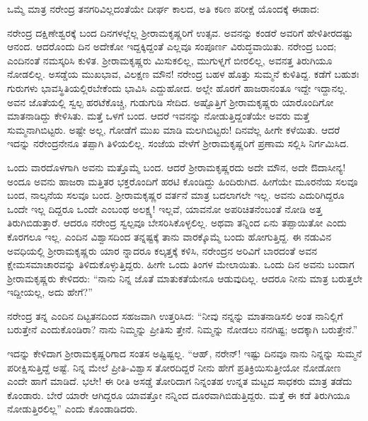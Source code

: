 ಒಮ್ಮೆ ಮಾತ್ರ ನರೇಂದ್ರ ತನಗರಿವಿಲ್ಲದಂತೆಯೇ ದೀರ್ಘ ಕಾಲದ, ಅತಿ ಕಠಿಣ ಪರೀಕ್ಷೆ ಯೊಂದಕ್ಕೆ ಈಡಾದ:

ನರೇಂದ್ರ ದಕ್ಷಿಣೇಶ್ವರಕ್ಕೆ ಬಂದ ದಿನಗಳಲ್ಲೆಲ್ಲ ಶ್ರೀರಾಮಕೃಷ್ಣರಿಗೆ ಉತ್ಸವ. ಅವನನ್ನು ಕಂಡರೆ ಅವರಿಗೆ ಹೇಳಿತೀರದಷ್ಟು ಆನಂದ. ಆದರೊಂದು ದಿನ ಅದೇಕೋ ಇದ್ದಕ್ಕಿದ್ದಂತೆ ಎಲ್ಲವೂ ಸಂಪೂರ್ಣ ವಿರುದ್ಧವಾಯಿತು. ನರೇಂದ್ರ ಬಂದ; ಎಂದಿನಂತೆ ನಮಸ್ಕರಿಸಿ ಕುಳಿತ. ಶ್ರೀರಾಮಕೃಷ್ಣರು ಮಿಸುಕಲಿಲ್ಲ, ಮುಗುಳ್ನಗೆ ಬೀರಲಿಲ್ಲ, ಅವನತ್ತ ತಿರುಗಿಯೂ ನೋಡಲಿಲ್ಲ. ಅಸಡ್ಡೆಯ ಮುಖಭಾವ, ವಿಲಕ್ಷಣ ಮೌನ! ನರೇಂದ್ರ ಬಹಳ ಹೊತ್ತು ಸುಮ್ಮನೆ ಕುಳಿತಿದ್ದ. ಕಡೆಗೆ ಬಹುಶಃ ಗುರುಗಳು ಭಾವಸ್ಥಿತಿಯಲ್ಲಿರಬೇಕೆಂದು ಭಾವಿಸಿ ಎದ್ದುಹೋದ. ಅಲ್ಲೇ ಹೊರಗೆ ಹಾಜರಾನಂತೂ ಇದ್ದೇ ಇದ್ದಾನಲ್ಲ. ಅವನ ಜೊತೆಯಲ್ಲಿ ಸ್ವಲ್ಪ ಹರಟೆಕೊಚ್ಚಿ, ಗುಡುಗುಡಿ ಸೇದಿದ. ಅಷ್ಟೊತ್ತಿಗೆ ಶ್ರೀರಾಮಕೃಷ್ಣರು ಯಾರೊಂದಿಗೋ ಮಾತನಾಡಿದ್ದು ಕೇಳಿಸಿತು. ಮತ್ತೆ ಒಳಗೆ ಬಂದ. ಆದರೆ ಇವನನ್ನು ನೋಡುತ್ತಿದ್ದಂತೆಯೇ ಅವರು ಮತ್ತೆ ಸುಮ್ಮನಾಗಿಬಿಟ್ಟರು. ಅಷ್ಟೇ ಅಲ್ಲ, ಗೋಡೆಗೆ ಮುಖ ಮಾಡಿ ಮಲಗಿಬಿಟ್ಟರು! ದಿನವೆಲ್ಲ ಹೀಗೇ ಕಳೆಯಿತು. ಆದರೆ ಇದನ್ನು ನರೇಂದ್ರನೇನೂ ತಪ್ಪಾಗಿ ತಿಳಿಯಲಿಲ್ಲ. ಸಂಜೆಯ ವೇಳೆಗೆ ಶ್ರೀರಾಮಕೃಷ್ಣರಿಗೆ ಪ್ರಣಾಮ ಸಲ್ಲಿಸಿ ನಿರ್ಗಮಿಸಿದ.

ಒಂದು ವಾರದೊಳಗಾಗಿ ಅವನು ಮತ್ತೊಮ್ಮೆ ಬಂದ. ಆದರೆ ಶ್ರೀರಾಮಕೃಷ್ಣರದು ಅದೇ ಮೌನ, ಅದೇ ಔದಾಸೀನ್ಯ! ಅಂದೂ ಅವನು ಹಾಜರಾ ಮತ್ತಿತರ ಭಕ್ತರೊಂದಿಗೆ ಹರಟಿ ಕೊಂಡಿದ್ದು ಹಿಂದಿರುಗಿದ. ಹೀಗೆಯೇ ಮೂರನೆಯ ಸಲವೂ ಬಂದ, ನಾಲ್ಕನೆಯ ಸಲವೂ ಬಂದ. ಶ್ರೀರಾಮಕೃಷ್ಣರ ವರ್ತನೆ ಮಾತ್ರ ಬದಲಾಗಲೇ ಇಲ್ಲ. ಅವನು ಎದುರಿಗಿದ್ದರೂ ಒಂದೇ ಇಲ್ಲ ದಿದ್ದರೂ ಒಂದೇ ಎಂಬಂಥ ಅಲಕ್ಷ್ಯ! ಇಲ್ಲವೆ, ಯಾವನೋ ಅಪರಿಚಿತನೆಂಬಂತೆ ನೋಡಿ ಅತ್ತ ತಿರುಗಿಬಿಡುತ್ತಾರೆ. ಆದರೂ ನರೇಂದ್ರ ಸ್ವಲ್ಪವೂ ಬೇಸರಿಸಿಕೊಳ್ಳಲಿಲ್ಲ. ಅಥವಾ ತನ್ನಿಂದ ಏನು ತಪ್ಪಾಯಿತೋ ಎಂದು ಕೊರಗಲೂ ಇಲ್ಲ. ಎಂದಿನ ವಿಶ್ವಾಸದಿಂದ ತನ್ನಷ್ಟಕ್ಕೆ ತಾನು ವಾರಕ್ಕೊಮ್ಮೆ ಬಂದು ಹೋಗುತ್ತಿದ್ದ. ಈ ನಡುವಿನ ಅವಧಿಯಲ್ಲಿ ಶ್ರೀರಾಮಕೃಷ್ಣರು ಯಾರ ನ್ನಾದರೂ ಕಲ್ಕತ್ತಕ್ಕೆ ಕಳಿಸಿ, ನರೇಂದ್ರನ ಅರಿವಿಗೆ ಬಾರದಂತೆ ಅವನ ಕ್ಷೇಮಸಮಾಚಾರವನ್ನು ತಿಳಿದುಕೊಳ್ಳುತ್ತಿದ್ದರು. ಹೀಗೇ ಒಂದು ತಿಂಗಳ ಮೇಲಾಯಿತು. ಒಂದು ದಿನ ಅವನು ಬಂದಾಗ ಶ್ರೀರಾಮಕೃಷ್ಣರು ಕೇಳಿದರು: “ನಾನು ನಿನ್ನ ಜೊತೆ ಮಾತುಕತೆಯೇನೂ ಆಡುವುದಿಲ್ಲ. ಆದರೂ ನೀನು ಮಾತ್ರ ಬರುತ್ತಲೇ ಇದ್ದೀಯಲ್ಲ, ಅದು ಹೇಗೆ?”

ನರೇಂದ್ರ ತನ್ನ ಎಂದಿನ ದಿಟ್ಟತನದಿಂದ ಸಹಜವಾಗಿ ಉತ್ತರಿಸಿದ: “ನೀವು ನನ್ನನ್ನು ಮಾತನಾಡಿಸಲಿ ಅಂತ ನಾನಿಲ್ಲಿಗೆ ಬರುತ್ತೇನೆ ಎಂದುಕೊಂಡಿರಾ? ನಾನು ನಿಮ್ಮನ್ನು ಪ್ರೀತಿಸು ತ್ತೇನೆ. ನಿಮ್ಮನ್ನು ನೋಡಲು ನನಗಿಷ್ಟ; ಅದಕ್ಕಾಗಿ ಬರುತ್ತೇನೆ.”

ಇದನ್ನು ಕೇಳಿದಾಗ ಶ್ರೀರಾಮಕೃಷ್ಣರಿಗಾದ ಸಂತಸ ಅಷ್ಟಿಷ್ಟಲ್ಲ. “ಆಹ್, ನರೇನ್! ಇಷ್ಟು ದಿನವೂ ನಾನು ನಿನ್ನನ್ನು ಸುಮ್ಮನೆ ಪರೀಕ್ಷಿಸುತ್ತಿದ್ದೆ ಅಷ್ಟೆ. ನಿನ್ನ ಮೇಲೆ ಪ್ರೀತಿ-ವಿಶ್ವಾಸ ತೋರದಿದ್ದರೆ ನೀನು ಹೇಗೆ ಪ್ರತಿಕ್ರಿಯಿಸುತ್ತೀಯೋ ನೋಡೋಣ ಎಂದೇ ಹಾಗೆ ಮಾಡಿದೆ. ಭಲೇ! ಈ ರೀತಿ ಅಸಡ್ಡೆ ತೋರಿದಾಗ ನಿನ್ನಂತಹ ಉನ್ನತ ಮಟ್ಟದ ಸಾಧಕರು ಮಾತ್ರ ತಡೆದು ಕೊಂಡಾರು. ಬೇರೆ ಯಾರೇ ಆಗಿದ್ದರೂ ಯಾವತ್ತೋ ನನ್ನಿಂದ ದೂರವಾಗಿಬಿಡುತ್ತಿದ್ದರು. ಮತ್ತೆ ಈ ಕಡೆ ತಿರುಗಿಯೂ ನೋಡುತ್ತಿರಲಿಲ್ಲ” ಎಂದು ಕೊಂಡಾಡಿದರು.

